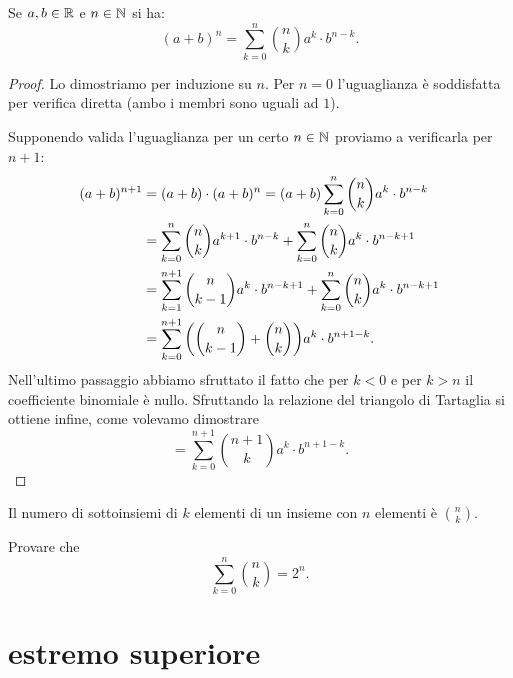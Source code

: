 \begin{theorem}
\mymark{***}
Se $a,b\in \mathbb R$ e $n\in \mathbb N$ si ha:
\[
(a+b)^n = \sum_{k=0}^n {n \choose k} a^k \cdot b^{n-k}.
\]
\end{theorem}
%
\begin{proof}
Lo dimostriamo per induzione su $n$.
Per $n=0$ l'uguaglianza è soddisfatta per verifica diretta (ambo i membri sono uguali ad $1$).

Supponendo valida l'uguaglianza per un certo $n\in \mathbb N$ proviamo a verificarla
per $n+1$:
\begin{align*}
(a+b)^{n+1}
&= (a+b)\cdot (a+b)^n
 = (a+b) \sum_{k=0}^n {n \choose k} a^k \cdot b^{n-k}\\
&= \sum_{k=0}^n {n \choose k} a^{k+1}\cdot b^{n-k}
   + \sum_{k=0}^n {n \choose k} a^k \cdot b^{n-k+1} \\
&= \sum_{k=1}^{n+1} {n \choose k-1} a^k \cdot b^{n-k+1}
   + \sum_{k=0}^n {n \choose k}a^k \cdot b^{n-k+1} \\
&= \sum_{k=0}^{n+1} {\left( {n \choose k-1} + {n \choose k} \right)} a^k \cdot b^{n+1-k}.
\end{align*}
Nell'ultimo passaggio abbiamo sfruttato il fatto che per $k<0$ e per $k>n$ il coefficiente binomiale è nullo.
Sfruttando la relazione del triangolo di Tartaglia si ottiene infine,
come volevamo dimostrare
\[
  = \sum_{k=0}^{n+1}{n+1 \choose k} a^k \cdot b^{n+1-k}.
\]
\end{proof}

\begin{exercise}
Il numero di sottoinsiemi di $k$ elementi di un insieme con $n$ elementi
è ${n\choose k}$.
\end{exercise}

\begin{exercise}
Provare che
\[
 \sum_{k=0}^n {n \choose k} = 2^n.
\]
\end{exercise}

\section{estremo superiore}

